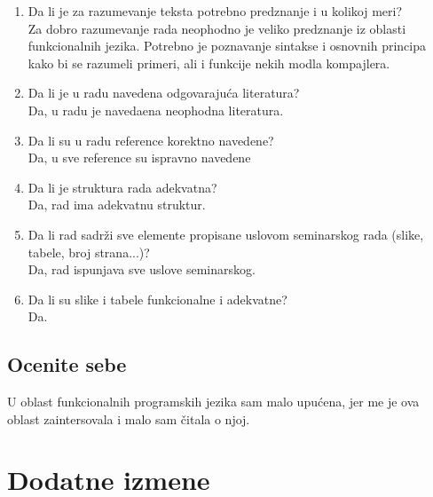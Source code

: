 \documentclass[a4paper]{report}
\begin{document}
\begin{enumerate}
		\item Da li je za razumevanje teksta potrebno 
		predznanje i u kolikoj meri?\\
		Za dobro razumevanje rada neophodno je veliko predznanje iz oblasti funkcionalnih jezika. Potrebno je poznavanje sintakse i osnovnih principa kako bi se razumeli primeri, ali i funkcije nekih modla kompajlera.
		
		\item Da li je u radu navedena odgovarajuća literatura?\\
		Da, u radu je navedaena neophodna literatura.
		
		\item Da li su u radu reference korektno navedene?\\
		Da, u sve reference su ispravno navedene
		
		\item Da li je struktura rada adekvatna?\\
		Da, rad ima adekvatnu struktur.
		
		\item Da li rad sadrži sve elemente propisane uslovom seminarskog rada (slike, tabele, broj strana...)?\\
		Da, rad ispunjava sve uslove seminarskog.
		
		\item Da li su slike i tabele funkcionalne i adekvatne?\\
		Da.
	\end{enumerate}
	
	\section{Ocenite sebe}
	
	U oblast funkcionalnih programskih jezika sam malo upućena, jer me je ova oblast zaintersovala i malo sam čitala o njoj.
	
	
	\chapter{Dodatne izmene}
	
\end{document}
